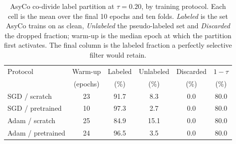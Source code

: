 \begin{table}[h!]
\centering
\begin{tabular}{lccccc}
\toprule
Protocol & Warm-up & Labeled & Unlabeled & Discarded & $1-\tau$ \\
 & (epochs) & (\%) & (\%) & (\%) & (\%) \\
\midrule
SGD / scratch & 23 & 91.7 & 8.3 & 0.0 & 80.0 \\
SGD / pretrained & 10 & 97.3 & 2.7 & 0.0 & 80.0 \\
Adam / scratch & 25 & 84.9 & 15.1 & 0.0 & 80.0 \\
Adam / pretrained & 24 & 96.5 & 3.5 & 0.0 & 80.0 \\
\bottomrule
\end{tabular}
\caption{AsyCo co-divide label partition at $\tau=0.20$, by training protocol. Each cell is the mean over the final 10 epochs and ten folds. \emph{Labeled} is the set AsyCo trains on as clean, \emph{Unlabeled} the pseudo-labeled set and \emph{Discarded} the dropped fraction; warm-up is the median epoch at which the partition first activates. The final column is the labeled fraction a perfectly selective filter would retain.}
\label{tab:mech-asyco-selection}
\end{table}
